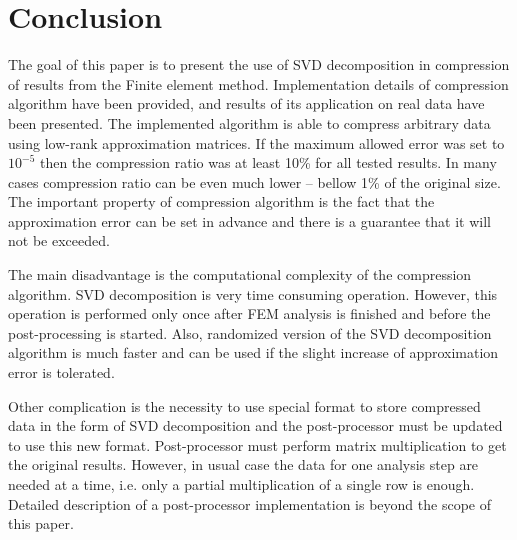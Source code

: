 \section{Conclusion}
\label{sec:conclusion}

The goal of this paper is to present the use of SVD decomposition in compression of results from the Finite element method. Implementation details of compression algorithm have been provided, and results of its application on real data have been presented. The implemented algorithm is able to compress arbitrary data using low-rank approximation matrices. If the maximum allowed error was set to $10^{-5}$ then the compression ratio was at least 10\% for all tested results. In many cases compression ratio can be even much lower -- bellow 1\% of the original size. The important property of compression algorithm is the fact that the approximation error can be set in advance and there is a guarantee that it will not be exceeded.

The main disadvantage is the computational complexity of the compression algorithm. SVD decomposition is very time consuming operation. However, this operation is performed only once after FEM analysis is finished and before the post-processing is started. Also, randomized version of the SVD decomposition algorithm is much faster and can be used if the slight increase of approximation error is tolerated. %

Other complication is the necessity to use special format to store compressed data in the form of SVD decomposition and the post-processor must be updated to use this new format. Post-processor must perform matrix multiplication to get the original results. However, in usual case the data for one analysis step are needed at a time, i.e. only a partial multiplication of a single row is enough. Detailed description of a post-processor implementation is beyond the scope of this paper.

